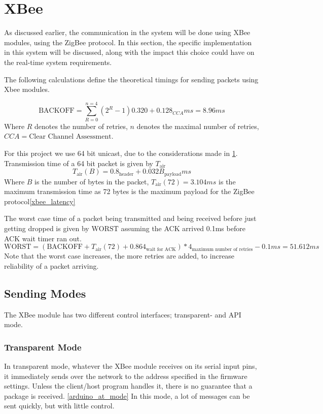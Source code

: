 \section{XBee}\label{sec:xbee}
As discussed earlier, the communication in the system will be done using XBee modules, using the ZigBee protocol. In this section, the specific implementation in this system will be discussed, along with the impact this choice could have on the real-time system requirements.

The following calculations define the theoretical timings for sending packets using Xbee modules.

\begin{equation*}
\text{BACKOFF} = \sum\limits_{R=0}^{n=4}(2^{R} - 1) 0.320 + 0.128_{CCA} ms = 8.96 ms
\end{equation*}
Where $R$ denotes the number of retries, $n$ denotes the maximal number of retries, $CCA = \text{Clear Channel Assessment}$.

For this project we use 64 bit unicast, due to the considerations made in \cref{sec:xbee}.
Transmission time of a 64 bit packet is given by $T_{\text{air}}$
\begin{equation*}
T_{\text{air}}(B) = 0.8_{\text{header}} + 0.032B_{\text{payload}} ms
\end{equation*}
Where $B$ is the number of bytes in the packet, $T_{\text{air}}(72) = 3.104 ms$ is the maximum transmission time as 72 bytes is the maximum payload for the ZigBee protocol\cref{xbee_latency}

The worst case time of a packet being transmitted and being received before just getting dropped is given by $\text{WORST}$ assuming the ACK arrived 0.1ms before ACK wait timer ran out.
\begin{equation*}
\text{WORST} = (\text{BACKOFF} + T_{\text{air}}(72) + 0.864_{\text{wait for ACK}})*4_{\text{maximum number of retries}} - 0.1 ms = 51.612 ms
\end{equation*}
Note that the worst case increases, the more retries are added, to increase reliability of a packet arriving.

\subsection{Sending Modes}
The XBee module has two different control interfaces; transparent- and API mode.
\subsubsection{Transparent Mode}
In transparent mode, whatever the XBee module receives on its serial input pins, it immediately sends over the network to the address specified in the firmware settings. Unless the client/host program handles it, there is no guarantee that a package is received. \cref{arduino_at_mode}
In this mode, a lot of messages can be sent quickly, but with little control.

